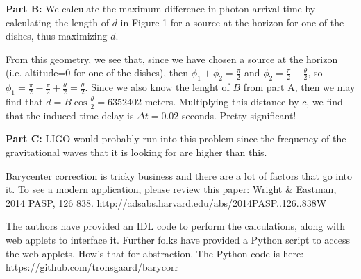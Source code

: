 \documentclass[12pt]{article}
\begin{document}
\begin{onehalfspacing}

\bigskip
\raggedright{\textbf{\large Part B: }}
We calculate the maximum difference in photon arrival time by calculating the length of $d$ in Figure 1 for a source at the horizon for one of the dishes, thus maximizing $d$.\bigskip

From this geometry, we see that, since we have chosen a source at the horizon (i.e. altitude=0 for one of the dishes), then $\phi_1 + \phi_2 = \frac{\pi}{2}$ and $\phi_2 = \frac{\pi}{2} - \frac{\theta}{2}$, so $\phi_1 = \frac{\pi}{2} - \frac{\pi}{2} + \frac{\theta}{2} = \frac{\theta}{2}$. Since we also know the lenght of $B$ from part A, then we may find that $d = B \cos{\frac{\theta}{2}} = 6352402$ meters. Multiplying this distance by $c$, we find that the induced time delay is $\Delta t = 0.02$ seconds. Pretty significant!

\bigskip
\bigskip
\raggedright{\textbf{\large Part C: }}
LIGO would probably run into this problem since the frequency of the gravitational waves that it is looking for are higher than this.

\bigskip
\bigskip









\iffalse
Barycenter correction is tricky business and there are a lot of factors that go into it. To see a modern application, please review this paper: Wright & Eastman, 2014 PASP, 126 838. http://adsabs.harvard.edu/abs/2014PASP..126..838W

The authors have provided an IDL code to perform the calculations, along with web applets to interface it. Further folks have provided a Python script to access the web applets. How’s that for abstraction. The Python code is here: https://github.com/tronsgaard/barycorr


\end{onehalfspacing}
\end{document}
